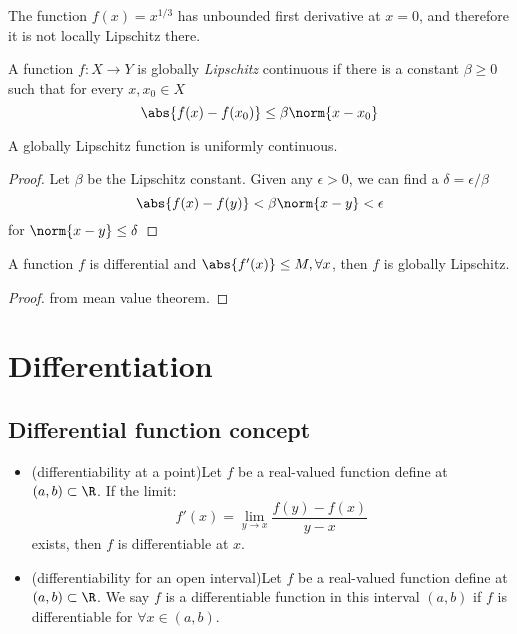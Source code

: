 \begin{refsection}
\begin{example}
The function $f(x) = x^{1/3}$ has unbounded first derivative at $x=0$, and therefore it is not locally Lipschitz there.
\end{example}




\begin{definition}
A function $f:X\rightarrow Y$ is globally \emph{Lipschitz} continuous if there is a constant $\beta \geq 0$ such that for every $x,x_0 \in X$
$$\abs{f(x)-f(x_0)} \leq \beta \norm{x-x_0}$$
\end{definition}

\begin{lemma}
A globally Lipschitz function is uniformly continuous.
\end{lemma}
\begin{proof}
	Let $\beta$ be the Lipschitz constant. 
Given any $\epsilon > 0$, we can find a $\delta = \epsilon/\beta$
$$\abs{f(x)-f(y)} < \beta \norm{x-y} < \epsilon$$
for $\norm{x-y}\leq \delta$
\end{proof}





\begin{lemma}
A function $f$ is differential and $\abs{f'(x)}\leq M, \forall x$, then $f$ is globally Lipschitz. 
\end{lemma}
\begin{proof}
from mean value theorem.	
\end{proof}





\section{Differentiation}
\subsection{Differential function concept}
\begin{definition}\hfill
\begin{itemize}
	\item (differentiability at a point)Let $f$ be a real-valued function define at $(a,b) \subset \R$. If the limit:
	$$f'(x)=\lim_{y\rightarrow x} \frac{f(y)-f(x)}{y-x}$$
	exists, then $f$ is differentiable at $x$.
	\item (differentiability for an open interval)Let $f$ be a real-valued function define at $(a,b) \subset \R$. We say $f$ is a differentiable function in this interval $(a,b)$ if $f$ is differentiable for $\forall x\in (a,b)$.
\end{itemize}	


\end{definition}
\end{refsection}
